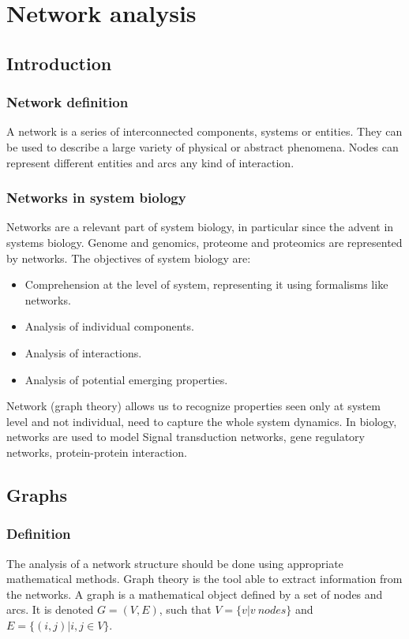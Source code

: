\graphicspath{{chapters/07/images/}}
\chapter{Network analysis}

\section{Introduction}

	\subsection{Network definition}
	A network is a series of interconnected components, systems or entities.
	They can be used to describe a large variety of physical or abstract phenomena.
	Nodes can represent different entities and arcs any kind of interaction.

	\subsection{Networks in system biology}
	Networks are a relevant part of system biology, in particular since the advent in systems biology. Genome and genomics, proteome and proteomics are represented by networks. 
	The objectives of system biology are:

		\begin{itemize}
			\item Comprehension at the level of system, representing it using formalisms like networks.
			\item Analysis of individual components.
			\item Analysis of interactions.
			\item Analysis of potential emerging properties.
		\end{itemize}

Network (graph theory) allows us to recognize properties seen only at system level and not individual, need to capture the whole system dynamics. 
In biology, networks are used to model Signal transduction networks, gene regulatory networks, protein-protein interaction.

\section{Graphs}

	\subsection{Definition}
	The analysis of a network structure should be done using appropriate mathematical methods.
	Graph theory is the tool able to extract information from the networks.
	A graph is a mathematical object defined by a set of nodes and arcs.
	It is denoted $G = (V, E)$, such that $V = \{v|v\ nodes\}$ and $E = \{(i,j)|i,j\in V\}$.

